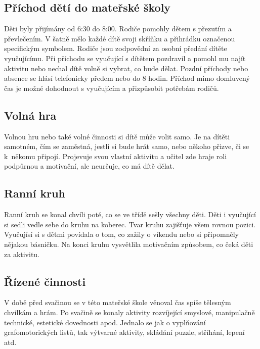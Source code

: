 		\subsection{Příchod dětí do mateřské školy}
			
			Děti byly přijímány od 6:30 do 8:00. Rodiče pomohly dětem s přezutím a převlečením. V šatně mělo každé dítě svoji skříňku a přihrádku označenou specifickým symbolem. Rodiče jsou zodpovědní za osobní předání dítěte vyučujícímu. Při příchodu se vyučující s dítětem pozdravil a pomohl mu najít aktivitu nebo nechal dítě volně si vybrat, co bude dělat. Pozdní příchody nebo absence se hlásí telefonicky předem nebo do 8 hodin. Příchod mimo domluvený čas je možné dohodnout s vyučujícím a přizpůsobit potřebám rodičů.


		\subsection{Volná hra}

			Volnou hru nebo také volné činnosti si dítě může volit samo. Je na dítěti samotném, čím se zaměstná, jestli si bude hrát samo, nebo někoho přizve, či se k někomu připojí. Projevuje svou vlastní aktivitu a učitel zde hraje roli podpůrnou a motivační, ale neurčuje, co má dítě dělat. 

		\subsection{Ranní kruh}

			Ranní kruh se konal chvíli poté, co se ve třídě sešly všechny děti. Děti i vyučující si sedli vedle sebe do kruhu na koberec. Tvar kruhu zajišťuje všem rovnou pozici. Vyučujísí si s dětmi povídala o tom, co zažily o víkendu nebo si připomněly nějakou básničku. Na konci kruhu vysvětlila motivačním způsobem, co čeká děti za aktivitu. 

		\subsection{Řízené činnosti}
		 	V době před svačinou se v této mateřské škole věnoval čas spíše tělesným chvilkám a hrám. Po svačině se konaly aktivity rozvíjející smyslové, manipulačně technické, estetické dovednosti apod. Jednalo se jak o vyplňování grafomotorických listů, tak výtvarné aktivity, skládání puzzle, stříhání, lepení atd. 


